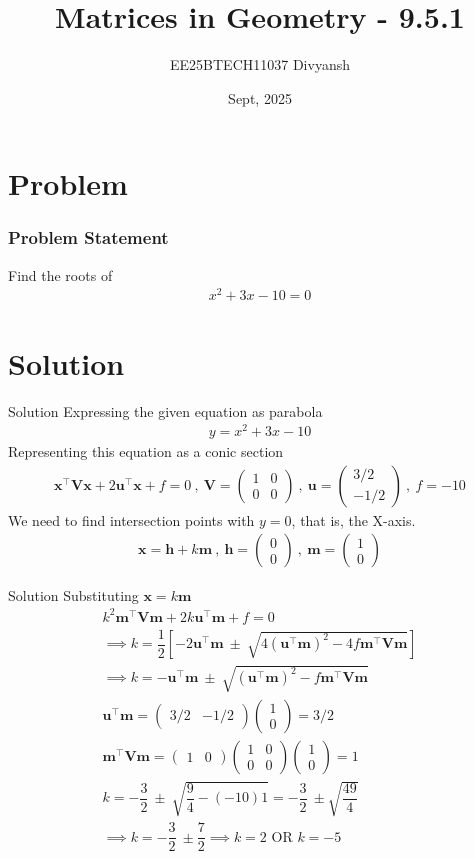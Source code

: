\documentclass{beamer}
\title{Matrices in Geometry - 9.5.1}
\author{EE25BTECH11037  Divyansh}
\date{Sept, 2025}
\let\vec\mathbf
\providecommand{\sbrak}[1]{\ensuremath{{}\left[#1\right]}}
\providecommand{\brak}[1]{\ensuremath{\left(#1\right)}}
\theoremstyle{remark}
\newcommand{\myvec}[1]{\ensuremath{\begin{pmatrix}#1\end{pmatrix}}}
\begin{document}
\maketitle


\section{Problem}
\begin{frame}
\frametitle{Problem Statement}
Find the roots of 
\begin{align}
    x^2 + 3x -10=0
\end{align}
\end{frame}

\section{Solution}
\begin{frame}{Solution}
Expressing the given equation as parabola 
\begin{align}
    y=x^2 + 3x -10
\end{align}
Representing this equation as a conic section
\begin{align}
    \vec{x}^{\top}\vec{V}\vec{x} + 2\vec{u}^{\top}\vec{x} + f=0 \ , \  \vec{V}=\myvec{1 & 0\\0&0} \ , \  \vec{u}=\myvec{3/2 \\ -1/2} \ ,\ f=-10
\end{align}
We need to find intersection points with $y=0$, that is, the X-axis.
\begin{align}
    \vec{x}=\vec{h} + k \vec{m} \ , \ \vec{h}=\myvec{0 \\ 0} \ , \ \vec{m}=\myvec{1 \\ 0}
\end{align}
\end{frame}

\begin{frame}{Solution}
Substituting $\vec{x} = k \vec{m}$ 
\begin{align}
    k^2\vec{m}^{\top}\vec{V}\vec{m} + 2k\vec{u}^{\top}\vec{m} + f=0 \\
    \implies k= \dfrac{1}{2} \sbrak{ -2\vec{u}^{\top}\vec{m} \ \pm \ \sqrt{4\brak{\vec{u}^{\top}\vec{m}}^2 - 4 f \vec{m}^{\top}\vec{V}\vec{m}}}\\
    \implies k= -\vec{u}^{\top}\vec{m} \ \pm \ \sqrt{\brak{\vec{u}^{\top}\vec{m}}^2-f \vec{m}^{\top}\vec{V}\vec{m}}\\
    \vec{u}^{\top}\vec{m} = \myvec{3/2 & -1/2}\myvec{1 \\0} =3/2 \\
    \vec{m}^{\top}\vec{V}\vec{m}=\myvec{1 & 0}\myvec{1 & 0\\0&0}\myvec{1 \\ 0} = 1\\
    k= -\dfrac{3}{2} \ \pm \ \sqrt{ \dfrac{9}{4 } - \brak{-10} 1} = -\dfrac{3}{2} \ \pm \sqrt{\dfrac{49}{4}}\\
    \implies k= - \dfrac{3}{2} \ \pm \dfrac{7}{2}\implies \boxed{ k= 2 \text{ OR } k=-5}
\end{align}
\end{frame}
\end{document}
